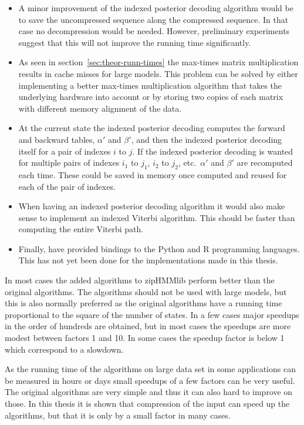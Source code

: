 \begin{itemize}
\item A minor improvement of the indexed posterior decoding algorithm would be
  to save the uncompressed sequence along the compressed sequence. In that case
  no decompression would be needed. However, preliminary experiments suggest
  that this will not improve the running time significantly.
\item As seen in section~\ref{sec:theor-runn-times} the max-times matrix
  multiplication results in cache misses for large models. This problem can be
  solved by either implementing a better max-times multiplication algorithm
  that takes the underlying hardware into account or by storing two copies of
  each matrix with different memory alignment of the data.
\item At the current state the indexed posterior decoding computes the forward
  and backward tables, $\alpha'$ and $\beta'$, and then the indexed posterior
  decoding itself for a pair of indexes $i$ to $j$. If the indexed posterior
  decoding is wanted for multiple pairs of indexes $i_1$ to $j_1$, $i_2$ to
  $j_2$, etc.\ $\alpha'$ and $\beta'$ are recomputed each time. These could be
  saved in memory once computed and reused for each of the pair of indexes.
\item When having an indexed posterior decoding algorithm it would also make
  sense to implement an indexed Viterbi algorithm. This should be faster than
  computing the entire Viterbi path.
\item Finally, \citet{sand2013ziphmmlib} have provided bindings to the Python
  and R programming languages. This has not yet been done for the
  implementations made in this thesis.
\end{itemize}

In most cases the added algorithms to zipHMMlib perform better than the original
algorithms. The algorithms should not be used with large models, but this is
also normally preferred as the original algorithms have a running time
proportional to the square of the number of states. In a few cases major
speedups in the order of hundreds are obtained, but in most cases the speedups
are more modest between factors 1 and 10. In some cases the speedup factor is
below 1 which correspond to a slowdown.

As the running time of the algorithms on large data set in some applications
can be measured in hours or days small speedups of a few factors can be very
useful. The original algorithms are very simple and thus it can also hard to
improve on those. In this thesis it is shown that compression of the input can
speed up the algorithms, but that it is only by a small factor in many cases.

